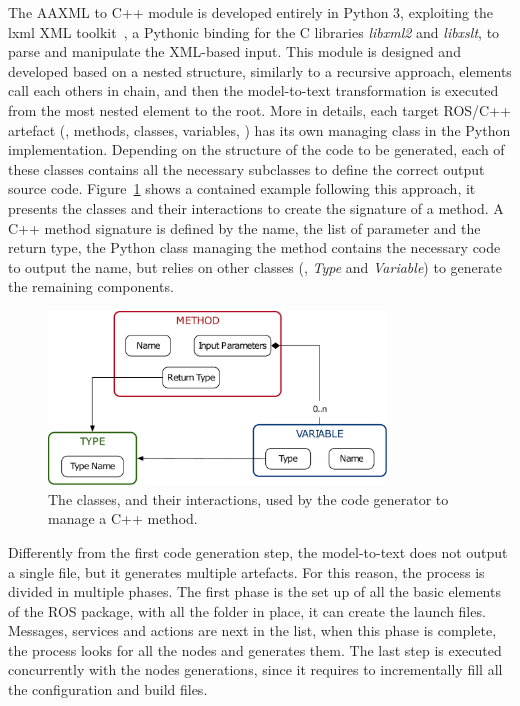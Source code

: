 The AAXML to C++ module is developed entirely in Python 3, exploiting the lxml XML toolkit~\cite{lxml}, a Pythonic binding for the C libraries \textit{libxml2} and \textit{libxslt}, to parse and manipulate the XML-based input. This module is designed and developed based on a nested structure, similarly to a recursive approach, elements call each others in chain, and then the model-to-text transformation is executed from the most nested element to the root. More in details, each target ROS/C++ artefact (\eg, methods, classes, variables, \etc) has its own managing class in the Python implementation. Depending on the structure of the code to be generated, each of these classes contains all the necessary subclasses to define the correct output source code. Figure~\ref{fig:russiandoll} shows a contained example following this approach, it presents the classes and their interactions to create the signature of a method. A C++ method signature is defined by the name, the list of parameter and the return type, the Python class managing the method contains the necessary code to output the name, but relies on other classes (\ie, \textit{Type} and \textit{Variable}) to generate the remaining components.

\begin{figure}[t]
    \centering
    \includegraphics[width=0.8\textwidth]{gfx/russiandoll}
    \caption{The classes, and their interactions, used by the code generator to manage a C++ method.}\label{fig:russiandoll}
\end{figure}

Differently from the first code generation step, the model-to-text does not output a single file, but it generates multiple artefacts. For this reason, the process is divided in multiple phases. The first phase is the set up of all the basic elements of the ROS package, with all the folder in place, it can create the launch files. Messages, services and actions are next in the list, when this phase is complete, the process looks for all the nodes and generates them. The last step is executed concurrently with the nodes generations, since it requires to incrementally fill all the configuration and build files.

